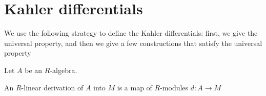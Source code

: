 %
%			
%
%

\section{Kahler differentials}


\newcommand{\Der}{\operatorname{Der}}

We use the following strategy to define
the Kahler differentials:
first, we give the universal property, 
and then we give a few constructions that
satisfy the universal property

Let \(A\) be an \(R\)-algebra. 
\begin{definition} \label{def:derivation}
	An \(R\)-linear derivation of \(A\) into \(M\) 
	is a map of \(R\)-modules
	\(d \colon A \to M\) 
\end{definition}

